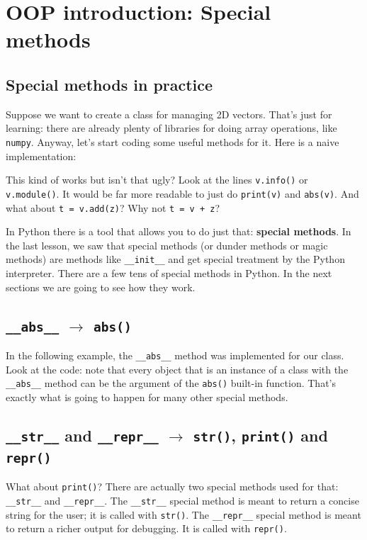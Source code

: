 \section{OOP introduction: Special methods}

\subsection{Special methods in practice}
Suppose we want to create a class for managing 2D vectors. That's just for learning: there are already plenty of libraries for doing array operations, like \texttt{numpy}. Anyway, let's start coding some useful methods for it. Here is a naive implementation:



This kind of works but isn't that ugly? Look at the lines \texttt{v.info()} or \texttt{v.module()}. It would be far more readable to just do \texttt{print(v)} and \texttt{abs(v)}. And what about \texttt{t = v.add(z)}? Why not \texttt{t = v + z}?

In Python there is a tool that allows you to do just that: \textbf{special methods}. In the last lesson, we saw that special methods (or dunder methods or magic methods) are methods like \texttt{\_\_init\_\_} and get special treatment by the Python interpreter. There are a few tens of special methods in Python. In the next sections we are going to see how they work. 

\subsection{\texttt{\_\_abs\_\_} \texorpdfstring{$\xrightarrow{}$}{->} \texttt{abs()}}

In the following example, the \texttt{\_\_abs\_\_} method was implemented for our class. Look at the code: note that every object that is an instance of a class with the \texttt{\_\_abs\_\_} method can be the argument of the \texttt{abs()} built-in function. That's exactly what is going to happen for many other special methods.



\subsection{\texttt{\_\_str\_\_} and \texttt{\_\_repr\_\_} \texorpdfstring{$\xrightarrow{}$}{->} \texttt{str()}, \texttt{print()} and \texttt{repr()}}

What about \texttt{print()}? There are actually two special methods used for that: \texttt{\_\_str\_\_} and \texttt{\_\_repr\_\_}. The \texttt{\_\_str\_\_} special method is meant to return a concise string for the user; it is called with \texttt{str()}. The \texttt{\_\_repr\_\_} special method is meant to return a richer output for debugging. It is called with \texttt{repr()}.

